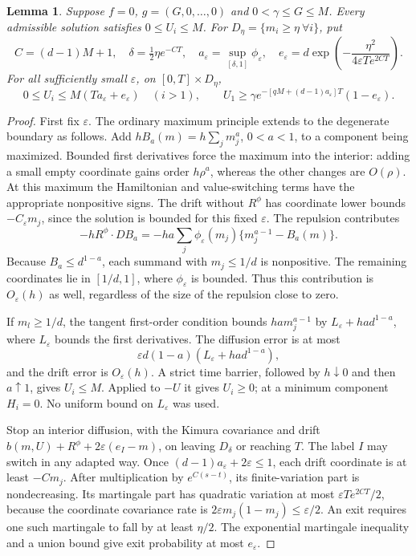 \documentclass[11pt]{article}
\newtheorem{lemma}{Lemma}
\newcommand{\eps}{\varepsilon}
\begin{document}
\begin{lemma}\label{localization}
Suppose $f=0$, $g=(G,0,\ldots,0)$ and $0<\gamma\le G\le M$. Every admissible solution satisfies $0\le U_i\le M$. For $D_\eta=\{m_i\ge\eta\ \forall i\}$, put
\[
 C=(d-1)M+1,\quad \delta=\tfrac12\eta e^{-CT},\quad
 a_\eps=\sup_{[\delta,1]}\phi_\eps,\quad
 e_\eps=d\exp\left(-\frac{\eta^2}{4\eps T e^{2CT}}\right).
\]
For all sufficiently small $\eps$, on $[0,T]\times D_\eta$,
\begin{equation}\label{passive}
 0\le U_i\le M(Ta_\eps+e_\eps)\quad(i>1),\qquad
 U_1\ge\gamma e^{-[qM+(d-1)a_\eps]T}(1-e_\eps).
\end{equation}
\end{lemma}
\begin{proof}
First fix $\eps$. The ordinary maximum principle extends to the degenerate boundary as follows. Add $hB_a(m)=h\sum_jm_j^a$, $0<a<1$, to a component being maximized. Bounded first derivatives force the maximum into the interior: adding a small empty coordinate gains order $h\rho^a$, whereas the other changes are $O(\rho)$. At this maximum the Hamiltonian and value-switching terms have the appropriate nonpositive signs. The drift without $R^\phi$ has coordinate lower bounds $-C_\eps m_j$, since the solution is bounded for this fixed $\eps$. The repulsion contributes
\[
 -hR^\phi\cdot DB_a=-ha\sum_j\phi_\eps(m_j)\{m_j^{a-1}-B_a(m)\}.
\]
Because $B_a\le d^{1-a}$, each summand with $m_j\le1/d$ is nonpositive. The remaining coordinates lie in $[1/d,1]$, where $\phi_\eps$ is bounded. Thus this contribution is $O_\eps(h)$ as well, regardless of the size of the repulsion close to zero.

If $m_l\ge1/d$, the tangent first-order condition bounds
$ha m_j^{a-1}$ by $L_\eps+ha d^{1-a}$, where $L_\eps$ bounds the first derivatives. The diffusion error is at most
\[
 \eps d(1-a)(L_\eps+ha d^{1-a}),
\]
and the drift error is $O_\eps(h)$. A strict time barrier, followed by $h\downarrow0$ and then $a\uparrow1$, gives $U_i\le M$. Applied to $-U$ it gives $U_i\ge0$; at a minimum component $H_i=0$. No uniform bound on $L_\eps$ was used.

Stop an interior diffusion, with the Kimura covariance and drift
$b(m,U)+R^\phi+2\eps(e_I-m)$, on leaving $D_\delta$ or reaching $T$. The label $I$ may switch in any adapted way. Once $(d-1)a_\eps+2\eps\le1$, each drift coordinate is at least $-Cm_j$. After multiplication by $e^{C(s-t)}$, its finite-variation part is nondecreasing. Its martingale part has quadratic variation at most $\eps T e^{2CT}/2$, because the coordinate covariance rate is $2\eps m_j(1-m_j)\le\eps/2$. An exit requires one such martingale to fall by at least $\eta/2$. The exponential martingale inequality and a union bound give exit probability at most $e_\eps$.


\end{proof}
\end{document}
